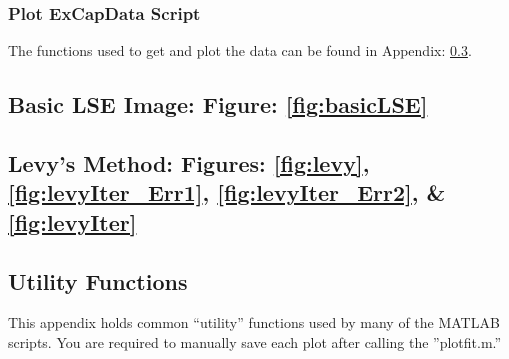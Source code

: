 \subsubsection{Plot ExCapData Script}
The functions used to get and plot the data can be found in Appendix: \ref{app:utilityFuns}.


\subsection{Basic LSE Image: Figure: \ref{fig:basicLSE}}


\subsection{Levy's Method: Figures: \ref{fig:levy}, \ref{fig:levyIter_Err1}, \ref{fig:levyIter_Err2}, \& \ref{fig:levyIter}}




\subsection{Utility Functions}
\label{app:utilityFuns}
This appendix holds common ``utility'' functions used by many of the MATLAB scripts. You are required to manually save each plot after calling the ''plotfit.m.''






